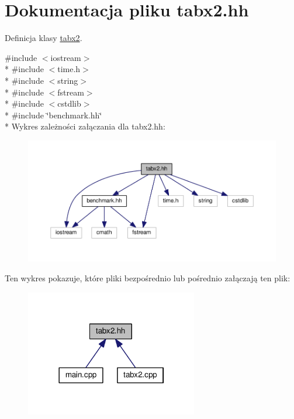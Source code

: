 \hypertarget{tabx2_8hh}{\section{Dokumentacja pliku tabx2.\-hh}
\label{tabx2_8hh}
}


Definicja klasy \hyperlink{classtabx2}{tabx2}.  


{\ttfamily \#include $<$iostream$>$}\\*
{\ttfamily \#include $<$time.\-h$>$}\\*
{\ttfamily \#include $<$string$>$}\\*
{\ttfamily \#include $<$fstream$>$}\\*
{\ttfamily \#include $<$cstdlib$>$}\\*
{\ttfamily \#include \char`\"{}benchmark.\-hh\char`\"{}}\\*
Wykres zależności załączania dla tabx2.\-hh\-:\nopagebreak
\begin{figure}[H]
\begin{center}
\leavevmode
\includegraphics[width=350pt]{tabx2_8hh__incl}
\end{center}
\end{figure}
Ten wykres pokazuje, które pliki bezpośrednio lub pośrednio załączają ten plik\-:\nopagebreak
\begin{figure}[H]
\begin{center}
\leavevmode
\includegraphics[width=213pt]{tabx2_8hh__dep__incl}
\end{center}
\end{figure}
